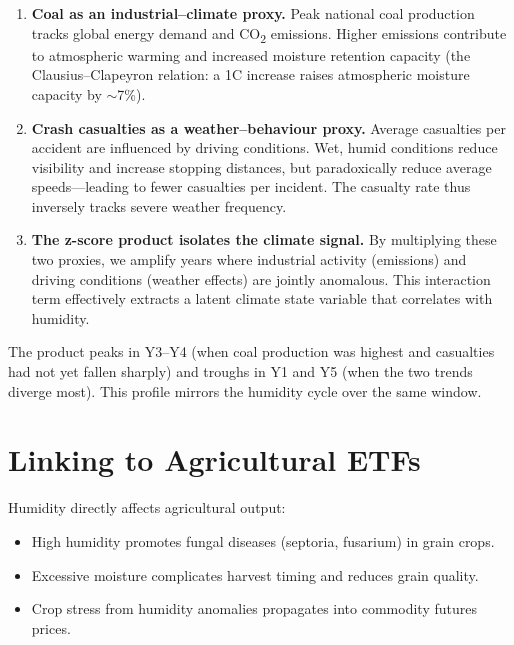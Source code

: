 \documentclass[12pt,a4paper]{article}
\begin{document}
\begin{enumerate}[nosep]
    \item \textbf{Coal as an industrial--climate proxy.} Peak national coal production tracks global energy demand and CO\textsubscript{2} emissions. Higher emissions contribute to atmospheric warming and increased moisture retention capacity (the Clausius--Clapeyron relation: a 1\textdegree C increase raises atmospheric moisture capacity by $\sim$7\%).

    \item \textbf{Crash casualties as a weather--behaviour proxy.} Average casualties per accident are influenced by driving conditions. Wet, humid conditions reduce visibility and increase stopping distances, but paradoxically reduce average speeds---leading to fewer casualties per incident. The casualty rate thus inversely tracks severe weather frequency.

    \item \textbf{The z-score product isolates the climate signal.} By multiplying these two proxies, we amplify years where industrial activity (emissions) and driving conditions (weather effects) are jointly anomalous. This interaction term effectively extracts a latent climate state variable that correlates with humidity.
\end{enumerate}

The product peaks in Y3--Y4 (when coal production was highest and casualties had not yet fallen sharply) and troughs in Y1 and Y5 (when the two trends diverge most). This profile mirrors the humidity cycle over the same window.

\section{Linking to Agricultural ETFs}

Humidity directly affects agricultural output:

\begin{itemize}[nosep]
    \item High humidity promotes fungal diseases (septoria, fusarium) in grain crops.
    \item Excessive moisture complicates harvest timing and reduces grain quality.
    \item Crop stress from humidity anomalies propagates into commodity futures prices.
\end{itemize}
\end{document}
